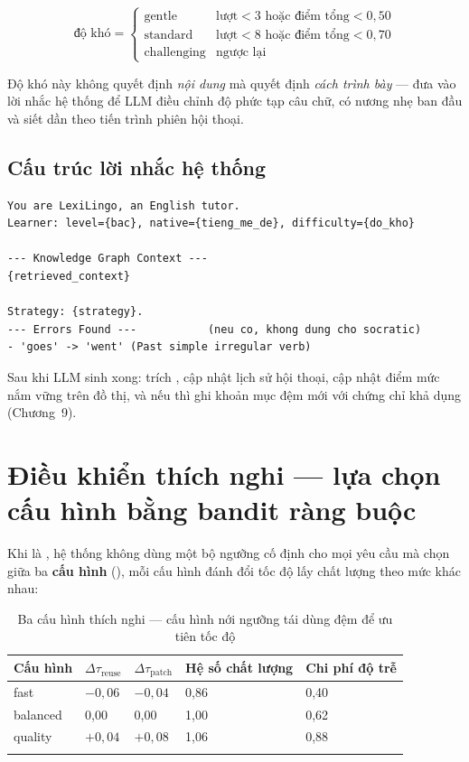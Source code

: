 \begin{equation}
\text{độ khó} =
\begin{cases}
\text{gentle} & \text{lượt} < 3 \text{ hoặc điểm tổng} < 0{,}50\\
\text{standard} & \text{lượt} < 8 \text{ hoặc điểm tổng} < 0{,}70\\
\text{challenging} & \text{ngược lại}
\end{cases}
\end{equation}

Độ khó này không quyết định \textit{nội dung} mà quyết định \textit{cách trình bày} — đưa
vào lời nhắc hệ thống để LLM điều chỉnh độ phức tạp câu chữ, có nương nhẹ ban đầu và siết
dần theo tiến trình phiên hội thoại.

\subsection{Cấu trúc lời nhắc hệ thống}

\begin{lstlisting}
You are LexiLingo, an English tutor.
Learner: level={bac}, native={tieng_me_de}, difficulty={do_kho}

--- Knowledge Graph Context ---
{retrieved_context}

Strategy: {strategy}.
--- Errors Found ---           (neu co, khong dung cho socratic)
- 'goes' -> 'went' (Past simple irregular verb)
\end{lstlisting}

Sau khi LLM sinh xong: trích , cập nhật lịch sử hội thoại, cập nhật
điểm mức nắm vững trên đồ thị, và nếu  thì ghi khoản mục
đệm mới với chứng chỉ khả dụng (Chương~9).

\section{Điều khiển thích nghi — lựa chọn cấu hình bằng bandit ràng buộc}

Khi  là , hệ thống không dùng một bộ ngưỡng cố
định cho mọi yêu cầu mà chọn giữa ba \textbf{cấu hình} (), mỗi cấu hình đánh
đổi tốc độ lấy chất lượng theo mức khác nhau:

\begin{longtable}{L{2.0cm} L{2.0cm} L{2.0cm} L{2.0cm} L{2.4cm}}
\toprule
\textbf{Cấu hình} & \(\Delta\tau_{\text{reuse}}\) & \(\Delta\tau_{\text{patch}}\) & \textbf{Hệ số chất lượng} & \textbf{Chi phí độ trễ}\\
\midrule
\endhead
fast & $-0{,}06$ & $-0{,}04$ & 0,86 & 0,40\\
balanced & 0,00 & 0,00 & 1,00 & 0,62\\
quality & $+0{,}04$ & $+0{,}08$ & 1,06 & 0,88\\
\bottomrule
\caption{Ba cấu hình thích nghi — cấu hình  nới ngưỡng tái dùng đệm để ưu tiên tốc độ}
\end{longtable}

